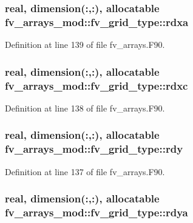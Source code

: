 \subsubsection[{rdxa}]{\setlength{\rightskip}{0pt plus 5cm}real, dimension(\-:,\-:), allocatable fv\-\_\-arrays\-\_\-mod\-::fv\-\_\-grid\-\_\-type\-::rdxa}\label{structfv__arrays__mod_1_1fv__grid__type_a80c3f1535ed4d68548891a0c36104b87}


Definition at line 139 of file fv\-\_\-arrays.\-F90.

\subsubsection[{rdxc}]{\setlength{\rightskip}{0pt plus 5cm}real, dimension(\-:,\-:), allocatable fv\-\_\-arrays\-\_\-mod\-::fv\-\_\-grid\-\_\-type\-::rdxc}\label{structfv__arrays__mod_1_1fv__grid__type_a96991b006ee53d3efe6b2e0334ef1011}


Definition at line 138 of file fv\-\_\-arrays.\-F90.

\subsubsection[{rdy}]{\setlength{\rightskip}{0pt plus 5cm}real, dimension(\-:,\-:), allocatable fv\-\_\-arrays\-\_\-mod\-::fv\-\_\-grid\-\_\-type\-::rdy}\label{structfv__arrays__mod_1_1fv__grid__type_a3634b07481a0ee2a9e4873bd266e2186}


Definition at line 137 of file fv\-\_\-arrays.\-F90.

\subsubsection[{rdya}]{\setlength{\rightskip}{0pt plus 5cm}real, dimension(\-:,\-:), allocatable fv\-\_\-arrays\-\_\-mod\-::fv\-\_\-grid\-\_\-type\-::rdya}\label{structfv__arrays__mod_1_1fv__grid__type_a4fba9fe1697d1c49fc8bc3b636c7970a}



